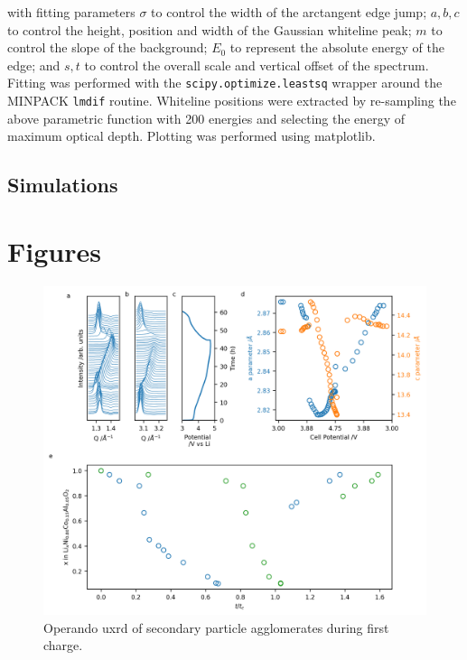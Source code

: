 \documentclass{article}
\begin{document}
with fitting parameters $\sigma$ to control the width of the
arctangent edge jump; $a, b, c$ to control the height, position and
width of the Gaussian whiteline peak; $m$ to control the slope of the
background; $E_0$ to represent the absolute energy of the edge; and
$s, t$ to control the overall scale and vertical offset of the
spectrum. Fitting was performed with the
\texttt{scipy.optimize.leastsq} wrapper around the MINPACK
\texttt{lmdif} routine\cite{scipy}. Whiteline positions were extracted
by re-sampling the above parametric function with 200 energies and
selecting the energy of maximum optical depth. Plotting was performed
using matplotlib\cite{matplotlib}.

\subsection{Simulations}


\section*{Figures}

\begin{figure}
  \includegraphics{figures/NCA_xrd.png}
  \caption{Operando \gls{uxrd} of \nca{} secondary particle
    agglomerates during first charge. }
  \label{fig:uxrd}
\end{figure}
\end{document}
